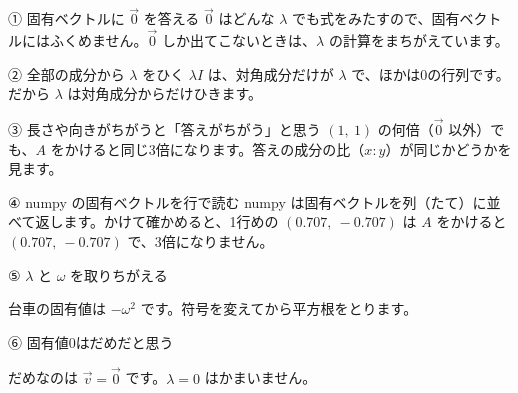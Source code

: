 
\begin{tsumazuki}{① 固有ベクトルに $\vec 0$ を答える}
$\vec 0$ はどんな $\lambda$ でも式をみたすので、固有ベクトルにはふくめません。$\vec 0$ しか出てこないときは、$\lambda$ の計算をまちがえています。
\end{tsumazuki}

\begin{tsumazuki}{② 全部の成分から $\lambda$ をひく}
$\lambda I$ は、対角成分だけが $\lambda$ で、ほかは0の行列です。だから $\lambda$ は対角成分からだけひきます。
\end{tsumazuki}

\begin{tsumazuki}{③ 長さや向きがちがうと「答えがちがう」と思う}
$(1,\ 1)$ の何倍（$\vec 0$ 以外）でも、$A$ をかけると同じ3倍になります。答えの成分の比（$x:y$）が同じかどうかを見ます。
\end{tsumazuki}

\begin{tsumazuki}{④ numpy の固有ベクトルを行で読む}
numpy は固有ベクトルを列（たて）に並べて返します。かけて確かめると、1行めの $(0.707,\ -0.707)$ は $A$ をかけると $(0.707,\ -0.707)$ で、3倍になりません。
\end{tsumazuki}

\begingroup{}%
\noindent\begin{minipage}[t]{0.485\linewidth}\vspace{0pt}
\begin{tsumazuki}{⑤ $\lambda$ と $\omega$ を取りちがえる}
\raggedright{}
台車の固有値は $-\omega^2$ です。符号を変えてから平方根をとります。
\end{tsumazuki}
\end{minipage}\hfill
\begin{minipage}[t]{0.485\linewidth}\vspace{0pt}
\begin{tsumazuki}{⑥ 固有値0はだめだと思う}
\raggedright{}
だめなのは $\vec v=\vec 0$ です。$\lambda=0$ はかまいません。
\end{tsumazuki}
\end{minipage}\par
\endgroup

